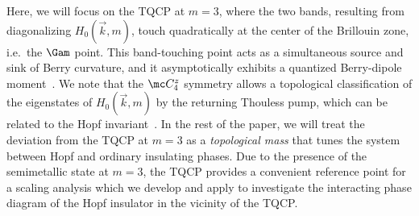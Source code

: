 \documentclass[reprint,floatfix, twocolumn]{revtex4-1}
\begin{document}
Here, we will focus on the TQCP at $m = 3$, where the two  bands, resulting from diagonalizing $H_0(\vec k,m)$, touch quadratically at the center of the Brillouin zone, i.e.~the $\Gam$ point. 
This band-touching point acts as a simultaneous source and  sink of Berry curvature, and it  asymptotically exhibits a quantized Berry-dipole moment~\cite{nelson2022}. 
We note that the $\mc C_{4}^z$ symmetry  allows a topological classification of the eigenstates of $H_0(\vec k,m)$ by the returning Thouless pump, which can be related to the Hopf invariant~\cite{nelson2021a,nelson2022}. 
In the rest of the paper, we will treat the deviation from the TQCP at $m=3$
as a \textit{topological mass} that tunes the system between Hopf and ordinary insulating phases. 
Due to the presence of the semimetallic state at $m = 3$, the TQCP provides a convenient reference point for a scaling analysis which we develop and apply to investigate the interacting phase diagram of the Hopf insulator in the vicinity of the TQCP.
\end{document}
